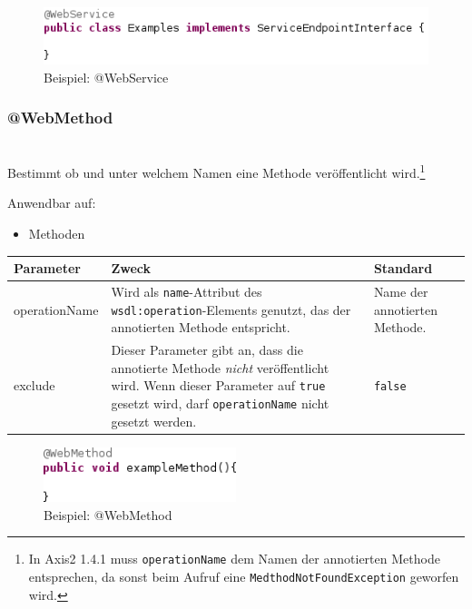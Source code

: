 \documentclass[runningheads]{llncs}
\newcommand{\anntabwidth}{\textwidth}
\begin{document}
    \begin{figure}[ht!]
      \centering
      \includegraphics[width=\textwidth]{../images/AtWebService.png}
      \caption{Beispiel: @WebService}
      \label{fig:ws}
    \end{figure} \vfill

    \subsubsection{@WebMethod}\ \\
      Bestimmt ob und unter welchem Namen eine Methode veröffentlicht wird.\footnote{In Axis2 1.4.1
      muss \texttt{operationName} dem Namen der annotierten Methode entsprechen, da sonst beim
      Aufruf eine \texttt{MedthodNotFoundException} geworfen wird.}

      \noindent{}Anwendbar auf:
      \begin{itemize}
       \item Methoden\vfill
      \end{itemize}
    \tymin=75pt
    \begin{tabulary}{\anntabwidth}{|l|L|L|}
    \hline
    \textbf{Parameter} & \textbf{Zweck} & \textbf{Standard} \\
    \hline
      operationName &
      Wird als \texttt{name}-Attribut des \texttt{wsdl:operation}-Elements genutzt, das der
      annotierten Methode entspricht. &
      Name der annotierten Methode. \\
    \hline
      exclude &
      Dieser Parameter gibt an, dass die annotierte Methode \emph{nicht} veröffentlicht wird.
      \newline Wenn dieser Parameter auf \texttt{true} gesetzt wird, darf \texttt{operationName}
      nicht gesetzt werden. &
      \texttt{false} \\
    \hline
    \end{tabulary} \vfill
    \tymin=10pt
    \begin{figure}[ht!]
      \centering
      \includegraphics[width=0.5\textwidth]{../images/AtWebMethod.png}
      \caption{Beispiel: @WebMethod}
      \label{fig:wm}
    \end{figure}
\end{document}
